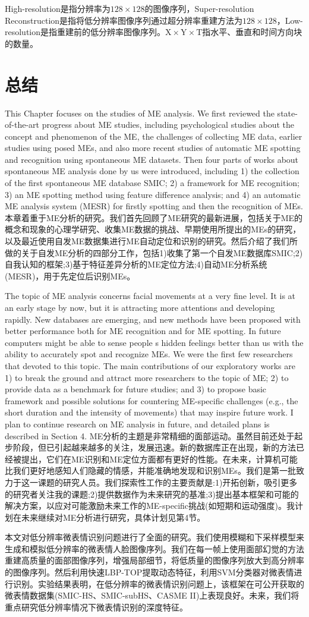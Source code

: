 High-resolution是指分辨率为$ 128 \times 128 $的图像序列，Super-resolution Reconstruction是指将低分辨率图像序列通过超分辨率重建方法为$ 128 \times 128 $，Low-resolution是指重建前的低分辨率图像序列。$ \mathrm{X} \times \mathrm{Y}  \times \mathrm{T} $指水平、垂直和时间方向块的数量。

\section{总结}

This Chapter focuses on the studies of ME analysis. We first reviewed the state-of-the-art progress about ME studies, including psychological studies about the concept and phenomenon of the ME, the challenges of collecting ME data, earlier studies using posed MEs, and also more recent studies of automatic ME spotting and recognition using spontaneous ME datasets. Then four parts of works about spontaneous ME analysis done by us were introduced, including 1) the collection of the first spontaneous ME database SMIC; 2) a framework for ME recognition; 3) an ME spotting method using feature difference analysis; and 4) an automatic ME analysis system (MESR) for firstly spotting and then the recognition of MEs.
本章着重于ME分析的研究。我们首先回顾了ME研究的最新进展，包括关于ME的概念和现象的心理学研究、收集ME数据的挑战、早期使用所提出的MEs的研究，以及最近使用自发ME数据集进行ME自动定位和识别的研究。然后介绍了我们所做的关于自发ME分析的四部分工作，包括1)收集了第一个自发ME数据库SMIC;2)自我认知的框架;3)基于特征差异分析的ME定位方法;4)自动ME分析系统(MESR)，用于先定位后识别MEs。

The topic of ME analysis concerns facial movements at a very fine level. It is at an early stage by now, but it is attracting more attentions and developing rapidly. New databases are emerging, and new methods have been proposed with better performance both for ME recognition and for ME spotting. In future computers might be able to sense people s hidden feelings better than us with the ability to accurately spot and recognize MEs. We were the first few researchers that devoted to this topic. The main contributions of our exploratory works are 1) to break the ground and attract more researchers to the topic of ME; 2) to provide data as a benchmark for future studies; and 3) to propose basic framework and possible solutions for countering ME-specific challenges (e.g., the short duration and the intensity of movements) that may inspire future work. I plan to continue research on ME analysis in future, and detailed plans is described in Section 4.
ME分析的主题是非常精细的面部运动。虽然目前还处于起步阶段，但已引起越来越多的关注，发展迅速。新的数据库正在出现，新的方法已经被提出，它们在ME识别和ME定位方面都有更好的性能。在未来，计算机可能比我们更好地感知人们隐藏的情感，并能准确地发现和识别MEs。我们是第一批致力于这一课题的研究人员。我们探索性工作的主要贡献是:1)开拓创新，吸引更多的研究者关注我的课题;2)提供数据作为未来研究的基准;3)提出基本框架和可能的解决方案，以应对可能激励未来工作的ME-specific挑战(如短期和运动强度)。我计划在未来继续对ME分析进行研究，具体计划见第4节。

本文对低分辨率微表情识别问题进行了全面的研究。我们使用模糊和下采样模型来生成和模拟低分辨率的微表情人脸图像序列。我们在每一帧上使用面部幻觉的方法重建高质量的面部图像序列，增强局部细节，将低质量的图像序列放大到高分辨率的图像序列。然后利用快速LBP-TOP提取动态特征，利用SVM分类器对微表情进行识别。实验结果表明，在低分辨率的微表情识别问题上，该框架在可公开获取的微表情数据集(SMIC-HS、SMIC-subHS、CASME II)上表现良好。未来，我们将重点研究低分辨率情况下微表情识别的深度特征。
